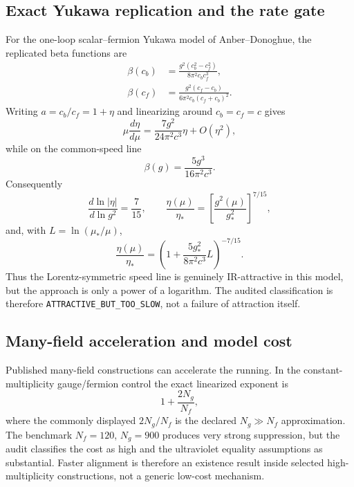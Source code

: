 \documentclass[11pt,a4paper]{article}
\begin{document}
\subsection{Exact Yukawa replication and the rate gate}
For the one-loop scalar--fermion Yukawa model of Anber--Donoghue, the replicated beta functions are
\begin{align}
\beta(c_b)&=\frac{g^2(c_b^2-c_f^2)}{8\pi^2c_bc_f^3},\\
\beta(c_f)&=\frac{g^2(c_f-c_b)}{6\pi^2c_b(c_f+c_b)^2}.
\end{align}
Writing $a=c_b/c_f=1+\eta$ and linearizing around $c_b=c_f=c$ gives
\begin{equation}
\mu\frac{d\eta}{d\mu}=\frac{7g^2}{24\pi^2c^3}\eta+O(\eta^2),
\end{equation}
while on the common-speed line
\begin{equation}
\beta(g)=\frac{5g^3}{16\pi^2c^3}.
\end{equation}
Consequently
\begin{equation}
\boxed{\frac{d\ln|\eta|}{d\ln g^2}=\frac{7}{15}},
\qquad
\boxed{\frac{\eta(\mu)}{\eta_*}=\left[\frac{g^2(\mu)}{g_*^2}\right]^{7/15}},
\end{equation}
and, with $L=\ln(\mu_*/\mu)$,
\begin{equation}
\frac{\eta(\mu)}{\eta_*}=\left(1+\frac{5g_*^2}{8\pi^2c^3}L\right)^{-7/15}.
\end{equation}
Thus the Lorentz-symmetric speed line is genuinely IR-attractive in this model, but the approach is only a power of a logarithm. The audited classification is therefore \texttt{ATTRACTIVE\_BUT\_TOO\_SLOW}, not a failure of attraction itself.

\subsection{Many-field acceleration and model cost}
Published many-field constructions can accelerate the running.  In the constant-multiplicity gauge/fermion control the exact linearized exponent is
\begin{equation}
1+\frac{2N_g}{N_f},
\end{equation}
where the commonly displayed $2N_g/N_f$ is the declared $N_g\gg N_f$ approximation.  The benchmark $N_f=120$, $N_g=900$ produces very strong suppression, but the audit classifies the cost as high and the ultraviolet equality assumptions as substantial.  Faster alignment is therefore an existence result inside selected high-multiplicity constructions, not a generic low-cost mechanism.
\end{document}
